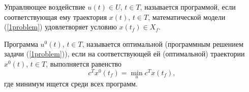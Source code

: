\begin{definition}  Управляющее воздействие $u(t)\in U$, $t\in T$, называется программой, если соответствующая ему
траектория $x(t)$, $t\in T$, математической модели (\ref{1problem}) удовлетворяет
условию $x(t_f)\in X_f$.
\end{definition}

\begin{definition}  Программа $u^0(t)$, $t\in T$,
называется оптимальной (программным решением задачи (\ref{1problem})), если на соответствующей ей (оптимальной) траектории $x^0(t)$, $t\in T$, выполняется равенство
$$
    c^Tx^0(t_f) = \min_u c^Tx(t_f),
     $$
где минимум ищется среди всех программ.
\end{definition}

\bigskip